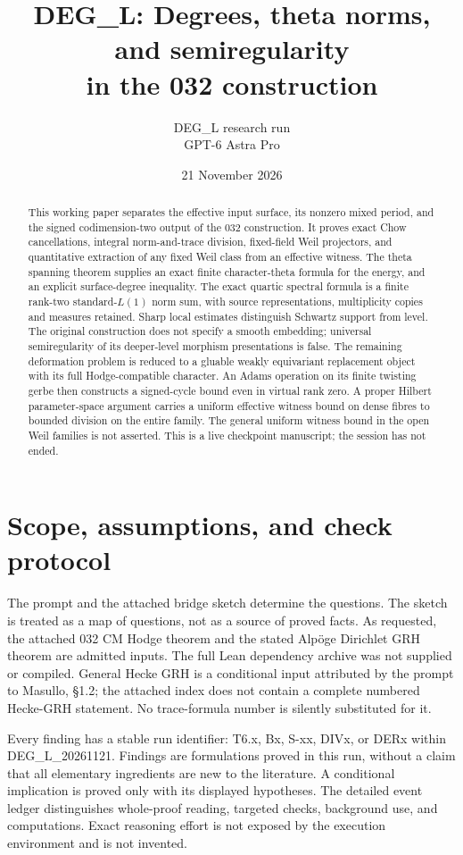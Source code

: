 \documentclass[11pt,a4paper]{article}
\title{DEG\_L: Degrees, theta norms, and semiregularity\\
in the 032 construction}
\author{DEG\_L research run\\GPT-6 Astra Pro}
\date{21 November 2026}
\theoremstyle{definition}
\begin{document}
\maketitle
\begin{abstract}
This working paper separates the effective input surface, its nonzero mixed
period, and the signed codimension-two output of the 032 construction.
It proves exact Chow cancellations, integral norm-and-trace division,
fixed-field Weil projectors, and quantitative extraction of any fixed Weil
class from an effective witness. The theta spanning theorem supplies an
exact finite character-theta formula for the energy, and an explicit
surface-degree inequality. The exact quartic spectral formula is a finite rank-two standard-$L(1)$
norm sum, with source representations, multiplicity copies and measures
retained. Sharp local estimates distinguish Schwartz support from level.
The original construction does not specify a smooth embedding; universal
semiregularity of its deeper-level morphism presentations is false. The
remaining deformation problem is reduced to a gluable weakly equivariant
replacement object with its full Hodge-compatible character. An Adams
operation on its finite twisting gerbe then constructs a signed-cycle
bound even in virtual rank zero. A proper Hilbert parameter-space
argument carries a uniform effective witness bound on dense fibres to
bounded division on the entire family. The general uniform witness bound
in the open Weil families is not asserted. This is a live checkpoint
manuscript; the session has not ended.
\end{abstract}
\tableofcontents
\clearpage
\section{Scope, assumptions, and check protocol}
The prompt and the attached bridge sketch determine the questions. The
sketch is treated as a map of questions, not as a source of proved facts.
As requested, the attached 032 CM Hodge theorem and the stated Alp\"oge
Dirichlet GRH theorem are admitted inputs. The full Lean dependency archive
was not supplied or compiled. General Hecke GRH is a conditional input
attributed by the prompt to Masullo, \S1.2; the attached index does not
contain a complete numbered Hecke-GRH statement. No trace-formula number
is silently substituted for it.

Every finding has a stable run identifier: T6.x, Bx, S-xx, DIVx, or DERx within
DEG\_L\_20261121. Findings are formulations proved in this run, without a
claim that all elementary ingredients are new to the literature. A
conditional implication is proved only with its displayed hypotheses.
The detailed event ledger distinguishes whole-proof reading, targeted
checks, background use, and computations. Exact reasoning effort is not
exposed by the execution environment and is not invented.
\end{document}
